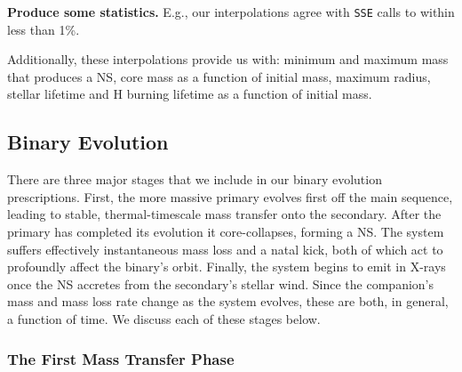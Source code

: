 \documentclass[12pt, preprint]{aastex}
\begin{document}
{\bf Produce some statistics.} E.g., our interpolations agree with {\tt SSE} calls to within less than 1\%. 

Additionally, these interpolations provide us with: minimum and maximum mass that produces a NS, core mass as a function of initial mass, maximum radius, stellar lifetime and H burning lifetime as a function of initial mass.





\subsection{Binary Evolution} \label{sec:binary_evolve}

There are three major stages that we include in our binary evolution prescriptions. First, the more massive primary evolves first off the main sequence, leading to stable, thermal-timescale mass transfer onto the secondary. After the primary has completed its evolution it core-collapses, forming a NS. The system suffers effectively instantaneous mass loss and a natal kick, both of which act to profoundly affect the binary's orbit. Finally, the system begins to emit in X-rays once the NS accretes from the secondary's stellar wind. Since the companion's mass and mass loss rate change as the system evolves, these are both, in general, a function of time. We discuss each of these stages below.



\subsubsection{The First Mass Transfer Phase} \label{sec:trans_MT}
\end{document}
